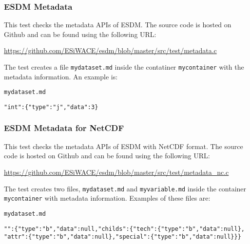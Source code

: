 \begin{framed}
\end{framed}

\subsubsection{ESDM Metadata}

\tab
This test checks the metadata APIs of ESDM. The source code is hosted on Github and can be found using the following URL:

\begin{center}
\url{https://github.com/ESiWACE/esdm/blob/master/src/test/metadata.c}
\end{center}

The test creates a file \texttt{mydataset.md} inside the contatiner \texttt{mycontainer} with the metadata information. An example is:

\begin{framed}

\vspace*{-0.3cm}

\texttt{mydataset.md}

\vspace*{-0.3cm}

\begin{verbatim}
"int":{"type":"j","data":3}
\end{verbatim}

\end{framed}

\subsubsection{ESDM Metadata for NetCDF}

\tab
This test checks the metadata APIs of ESDM with NetCDF format. The source code is hosted on Github and can be found using the following URL:

\begin{center}
\url{https://github.com/ESiWACE/esdm/blob/master/src/test/metadata_nc.c}
\end{center}

The test creates two files, \texttt{mydataset.md} and \texttt{myvariable.md} inside the container \texttt{mycontainer} with metadata information. Examples of these files are:

\begin{framed}

\texttt{mydataset.md}

\vspace*{-0.3cm}

\begin{verbatim}
"":{"type":"b","data":null,"childs":{"tech":{"type":"b","data":null},
"attr":{"type":"b","data":null},"special":{"type":"b","data":null}}}
\end{verbatim}

\end{framed}

